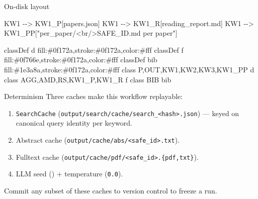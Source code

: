 \documentclass[
  ignorenonframetext,
]{beamer}
\newenvironment{Shaded}{}{}
\newcommand{\NormalTok}[1]{#1}
\providecommand{\tightlist}{%
  \setlength{\itemsep}{0pt}\setlength{\parskip}{0pt}}
\begin{document}
\begin{frame}{On-disk layout}
\begin{Shaded}
\begin{Highlighting}[]
\NormalTok{    KW1 {-}{-}\textgreater{} KW1\_P[papers.json]}
\NormalTok{    KW1 {-}{-}\textgreater{} KW1\_R[reading\_report.md]}
\NormalTok{    KW1 {-}{-}\textgreater{} KW1\_PP["per\_paper/\textless{}br/\textgreater{}SAFE\_ID.md per paper"]}

\NormalTok{    classDef d fill:\#0f172a,stroke:\#0f172a,color:\#fff}
\NormalTok{    classDef f fill:\#0f766e,stroke:\#0f172a,color:\#fff}
\NormalTok{    classDef bib fill:\#1e3a8a,stroke:\#0f172a,color:\#fff}
\NormalTok{    class P,OUT,KW1,KW2,KW3,KW1\_PP d}
\NormalTok{    class AGG,AMD,RS,KW1\_P,KW1\_R f}
\NormalTok{    class BIB bib}
\end{Highlighting}
\end{Shaded}
\end{frame}

\begin{frame}{Determinism}
\protect{}\label{determinism}
Three caches make this workflow replayable:

\begin{enumerate}
\tightlist
\item
  \texttt{SearchCache}
  (\texttt{output/search/cache/search\_\textless{}hash\textgreater{}.json})
  --- keyed on canonical query identity per keyword.
\item
  Abstract cache
  (\texttt{output/cache/abs/\textless{}safe\_id\textgreater{}.txt}).
\item
  Fulltext cache
  (\texttt{output/cache/pdf/\textless{}safe\_id\textgreater{}.\{pdf,txt\}}).
\item
  LLM seed () +
  temperature (\texttt{0.0}).
\end{enumerate}

Commit any subset of these caches to version control to freeze a run.
\end{frame}
\end{document}
